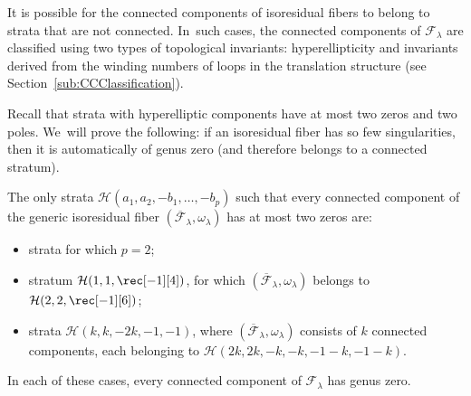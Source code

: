 
It is possible for the connected components of isoresidual fibers to belong to strata that are not connected. In~such cases, the connected components of $\mathcal F_\lambda$ are classified using two types of topological invariants: hyperellipticity and invariants derived from the winding numbers of loops in the translation structure (see Section~\ref{sub:CCClassification}).

Recall that strata with hyperelliptic components have at most two zeros and two poles. We~will prove the following: if an isoresidual fiber has so few singularities, then it is automatically of genus zero (and therefore belongs to a connected stratum).
\begin{prop}\label{prop:AdditionalTwozeros}
The only strata $\mathcal{H}(a_{1},a_{2},-b_{1},\dots,-b_{p})$ such that every connected component of the generic isoresidual fiber $(\overline{\mathcal{F}}_{\lambda},\omega_{\lambda})$ has at most two zeros are:
\begin{itemize}
\item strata for which $p=2$;
\item stratum $\mathcal{H}(1,1,\rec[-1][4])$, for which $(\overline{\mathcal{F}}_{\lambda},\omega_{\lambda})$ belongs to $\mathcal{H}(2,2,\rec[-1][6])$;
\item strata $\mathcal{H}(k,k,-2k,-1,-1)$, where $(\overline{\mathcal{F}}_{\lambda},\omega_{\lambda})$ consists of $k$ connected components, each belonging to $\mathcal{H}(2k,2k,-k,-k,-1-k,-1-k)$.
\end{itemize}
In each of these cases, every connected component of $\mathcal{F}_{\lambda}$ has genus zero.
\end{prop}

